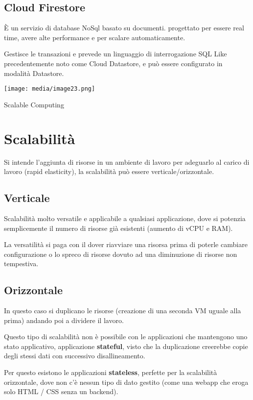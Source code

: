 \subsection{Cloud Firestore}\label{cloud-firestore}

È un servizio di database NoSql basato su documenti. progettato per
essere real time, avere alte performance e per scalare automaticamente.

Gestisce le transazioni e prevede un linguaggio di interrogazione SQL
Like precedentemente noto come Cloud Datastore, e può essere configurato
in modalità Datastore.

\texttt{[image: media/image23.png]}

Scalable Computing

\section{Scalabilità}\label{scalabilituxe0}

Si intende l'aggiunta di risorse in un ambiente di lavoro per adeguarlo
al carico di lavoro (rapid elasticity), la scalabilità può essere
verticale/orizzontale.

\subsection{Verticale}\label{verticale}

Scalabilità molto versatile e applicabile a qualsiasi applicazione, dove
si potenzia semplicemente il numero di risorse già esistenti (aumento di
vCPU e RAM).

La versatilità si paga con il dover riavviare una risorsa prima di
poterle cambiare configurazione o lo spreco di risorse dovuto ad una
diminuzione di risorse non tempestiva.

\subsection{Orizzontale}\label{orizzontale}

In questo caso si duplicano le risorse (creazione di una seconda VM
uguale alla prima) andando poi a dividere il lavoro.

Questo tipo di scalabilità non è possibile con le applicazioni che
mantengono uno stato applicativo, applicazione \textbf{stateful}, visto
che la duplicazione creerebbe copie degli stessi dati con successivo
disallineamento.

Per questo esistono le applicazioni \textbf{stateless}, perfette per la
scalabilità orizzontale, dove non c'è nessun tipo di dato gestito (come
una webapp che eroga solo HTML / CSS senza un backend).

